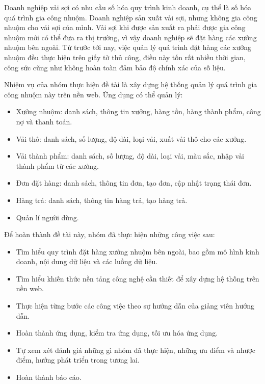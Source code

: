 Doanh nghiệp vải sợi có nhu cầu số hóa quy trình kinh doanh, cụ thể là số hóa quá trình gia công nhuộm. Doanh nghiệp sản xuất vải sợi, nhưng không gia công nhuộm cho vải sợi của mình. Vải sợi khi được sản xuất ra phải được gia công nhuộm mới có thể đưa ra thị trường, vì vậy doanh nghiệp sẽ đặt hàng các xưởng nhuộm bên ngoài. Từ trước tới nay, việc quản lý quá trình đặt hàng các xưởng nhuộm đều thực hiện trên giấy tờ thủ công, điều này tốn rất nhiều thời gian, công sức cũng như không hoàn toàn đảm bảo độ chính xác của số liệu.\par
Nhiệm vụ của nhóm thực hiện đề tài là xây dựng hệ thống quản lý quá trình gia công nhuộm này trên nền web. Ứng dụng có thể quản lý:
\begin{itemize}
    \item Xưởng nhuộm: danh sách, thông tin xưởng, hàng tồn, hàng thành phẩm, công nợ và thanh toán.
    \item Vải thô: danh sách, số lượng, độ dài, loại vải, xuất vải thô cho các xưởng.
    \item Vải thành phẩm: danh sách, số lượng, độ dài, loại vải, màu sắc, nhập vải thành phẩm từ các xưởng.
    \item Đơn đặt hàng: danh sách, thông tin đơn, tạo đơn, cập nhật trạng thái đơn.
    \item Hàng trả: danh sách, thông tin hàng trả, tạo hàng trả.
    \item Quản lí người dùng.
\end{itemize}
Để hoàn thành đề tài này, nhóm đã thực hiện những công việc sau:
\begin{itemize}
    \item Tìm hiểu quy trình đặt hàng xưởng nhuộm bên ngoài, bao gồm mô hình kinh doanh, nội dung dữ liệu và các luồng dữ liệu.
    \item Tìm hiểu khiến thức nền tảng công nghệ cần thiết để xây dựng hệ thống trên nền web.
    \item Thực hiện từng bước các công việc theo sự hướng dẫn của giảng viên hướng dẫn.
    \item Hoàn thành ứng dụng, kiểm tra ứng dụng, tối ưu hóa ứng dụng.
    \item Tự xem xét đánh giá những gì nhóm đã thực hiện, những ưu điểm và nhược điểm, hướng phát triển trong tương lai.
    \item Hoàn thành báo cáo.
\end{itemize}

